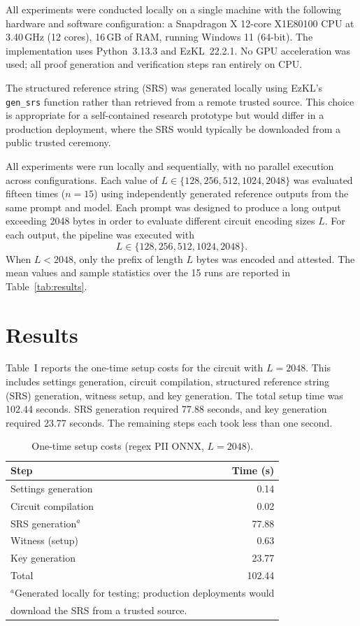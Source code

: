 \documentclass[10pt,conference,a4paper]{IEEEtran}
\begin{document}
All experiments were conducted locally on a single machine with the following hardware and software configuration: a Snapdragon X 12-core X1E80100 CPU at 3.40\,GHz (12 cores), 16\,GB of RAM, running Windows 11 (64-bit). The implementation uses Python~3.13.3 and EzKL~22.2.1. No GPU acceleration was used; all proof generation and verification steps ran entirely on CPU.

The structured reference string (SRS) was generated locally using EzKL's \texttt{gen\_srs} function rather than retrieved from a remote trusted source. This choice is appropriate for a self-contained research prototype but would differ in a production deployment, where the SRS would typically be downloaded from a public trusted ceremony.

All experiments were run locally and sequentially, with no parallel execution across configurations. Each value of $L \in \{128, 256, 512, 1024, 2048\}$ was evaluated fifteen times ($n = 15$) using independently generated reference outputs from the same prompt and model. Each prompt was designed to produce a long output exceeding 2048 bytes in order to evaluate different circuit encoding sizes $L$. For each output, the pipeline was executed with \[L \in \{128, 256, 512, 1024, 2048\}.\] When $L < 2048$, only the prefix of length $L$ bytes was encoded and attested. The mean values and sample statistics over the 15 runs are reported in Table~\ref{tab:results}.

\section{Results}

Table~I reports the one-time setup costs for the circuit with $L = 2048$. This includes settings generation, circuit compilation, structured reference string (SRS) generation, witness setup, and key generation. The total setup time was 102.44 seconds. SRS generation required 77.88 seconds, and key generation required 23.77 seconds. The remaining steps each took less than one second.

\begin{table}[htbp]
\centering
\caption{One-time setup costs (regex PII ONNX, $L=2048$).}
\label{tab:setup}
\begin{tabular}{l r}
\hline
\hline
Step & Time (s) \\
\hline
Settings generation & 0.14 \\
Circuit compilation & 0.02 \\
SRS generation$^{a}$ & 77.88 \\
Witness (setup) & 0.63 \\
Key generation & 23.77 \\
\hline
Total & 102.44 \\
\hline
\hline
\multicolumn{2}{l}{\small $^{a}$Generated locally for testing; production deployments would} \\
\multicolumn{2}{l}{\small download the SRS from a trusted source.} \\
\end{tabular}
\end{table}
\end{document}
